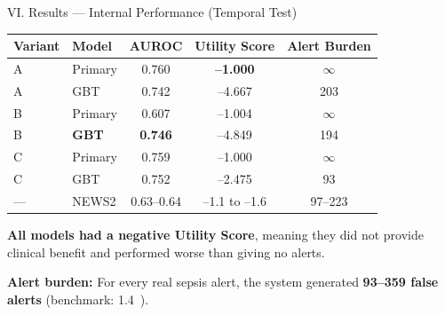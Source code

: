 \documentclass[aspectratio=169,10pt]{beamer}
\newcommand{\tablestyle}{%
  \renewcommand{\arraystretch}{1.2}%
  \small%
}
\begin{document}
\begin{frame}{VI. Results --- Internal Performance (Temporal Test)}
\begin{center}
\tablestyle
\begin{tabular}{llccc}
\toprule
\textbf{Variant} & \textbf{Model} & \textbf{AUROC} & \textbf{Utility Score} & \textbf{Alert Burden} \\
\midrule
A & Primary & 0.760 & \textbf{--1.000} & $\infty$ \\
A & GBT     & 0.742 & --4.667 & 203 \\
B & Primary & 0.607 & --1.004 & $\infty$ \\
B & \textbf{GBT} & \textbf{0.746} & --4.849 & 194 \\
C & Primary & 0.759 & --1.000 & $\infty$ \\
C & GBT     & 0.752 & --2.475 & 93 \\
--- & NEWS2 & 0.63--0.64 & --1.1 to --1.6 & 97--223 \\
\bottomrule
\end{tabular}
\end{center}

\vspace{6pt}
\textbf{All models had a negative Utility Score}, meaning they did not provide clinical benefit and performed worse than giving no alerts.

\vspace{3pt}
\textbf{Alert burden:} For every real sepsis alert, the system generated \textbf{93--359 false alerts} (benchmark: 1.4~\cite{moor2023review}).
\end{frame}
\end{document}
